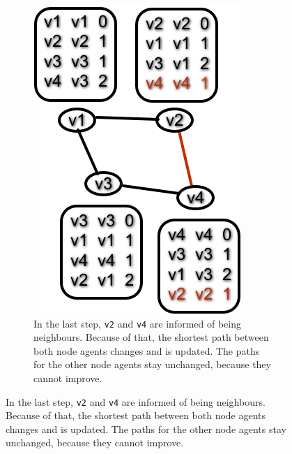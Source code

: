 \begin{figure}
\begin{subfigure}{.45\textwidth}
        \includegraphics[width=\textwidth] {images/dv5.png}
        \caption{In the last step, \texttt{v2} and \texttt{v4} are informed of being neighbours.
                 Because of that, the shortest path between both node agents changes and is updated.
                 The paths for the other node agents stay unchanged, because they cannot improve.}
    \end{subfigure}
\end{figure}

